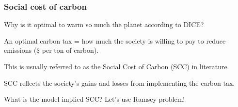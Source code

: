 \documentclass[xcolor=x11names,compress,aspectratio=169]{beamer}%
\makeatletter
\newenvironment{stepitemizewithalert}{\begin{itemize}[<+-| alert@+>]}{\end{itemize} }
\renewenvironment{itemize}{\begin{compactitemize}[<+-| alert@+>]}{\end{compactitemize}}
\renewenvironment{stepitemizewithalert}{\begin{compactitemize}[<+-| alert@+>]}{\end{compactitemize}}
\renewenvironment{stepitemizewithalert}{\begin{itemize}}{\end{itemize}}
\makeatother
\begin{document}
\begin{frame}%
%

\frametitle{Social cost of carbon}%


\begin{stepitemizewithalert}
\item Why is it optimal to warm so much the planet according to DICE?%
\vspace{1.5ex}%


\item An optimal carbon tax = how much the society is willing to pay to reduce
emissions (\$ per ton of carbon).%
\vspace{1.5ex}%


\item This is usually referred to as the Social Cost of Carbon (SCC) in
literature.%
\vspace{1.5ex}%


\item SCC reflects the society's gains and losses from implementing the carbon
tax.%
\vspace{1.5ex}%


\item What is the model implied SCC? Let's use Ramsey problem!
\end{stepitemizewithalert}

%

\transboxout
\end{frame}%
%
\end{document}
